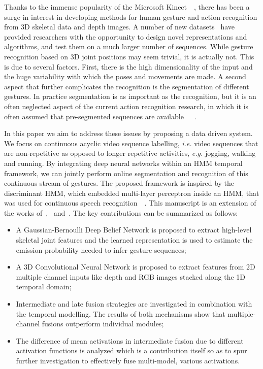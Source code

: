 Thanks to the immense popularity of the Microsoft Kinect~\cite{shotton2011real}~\cite{lingshao2}, there has been a surge in interest in developing methods for human gesture and action recognition from 3D skeletal data and depth images.
A number of new datasets~\cite{ICMI,fothergill2012instructing,guyon2012chalearn,wang2012mining} have provided researchers with the opportunity to design novel representations and algorithms, and test them on a much larger number of sequences.
While gesture recognition based on 3D joint positions may seem trivial, it is actually not. This is due to several factors. First, there is the high dimensionality of the input and the huge variability with which the poses and movements are made.
A second aspect that further complicates the recognition is the segmentation of different gestures. In practice segmentation is as important as the recognition, but it is an often neglected aspect of the current action recognition research, in which it is often assumed that  pre-segmented sequences are available~\cite{laptev2005space}~\cite{marszalek09}~\cite{Kuehne11}.

In this paper we aim to address these issues by proposing a data driven system. We focus on continuous acyclic video sequence labelling, \emph{i.e.} video sequences that are non-repetitive as opposed to longer repetitive activities, \textit{e.g.} jogging, walking and running. By integrating deep neural networks within an HMM temporal framework, we can jointly perform online segmentation and recognition of this continuous stream of gestures. The proposed framework is inspired by the discriminant HMM, which embedded multi-layer perceptron inside an HMM, that was used for continuous speech recognition~\cite{renals1994connectionist}~\cite{bourlard1994connectionist}.
This manuscript is an extension of the works of~\cite{diwucvpr14},~\cite{wu2014deep} and~\cite{lio2014deep}.
The key contributions can be summarized as follows:
\begin{itemize}
\item A Gaussian-Bernoulli Deep Belief Network is proposed to extract high-level skeletal joint features and the learned representation is used to estimate the emission probability needed to infer gesture sequences;
\item A 3D Convolutional Neural Network  is proposed to extract features from 2D multiple channel inputs like  depth and RGB images stacked along the 1D temporal domain;
\item Intermediate and late fusion strategies are investigated in combination with the temporal modelling. The results of both mechanisms show that multiple-channel fusions outperform individual modules;
\item The difference of mean activations in intermediate fusion due to different activation functions is analyzed which is a contribution itself so as to spur further investigation to effectively fuse multi-model, various activations.
\end{itemize}

